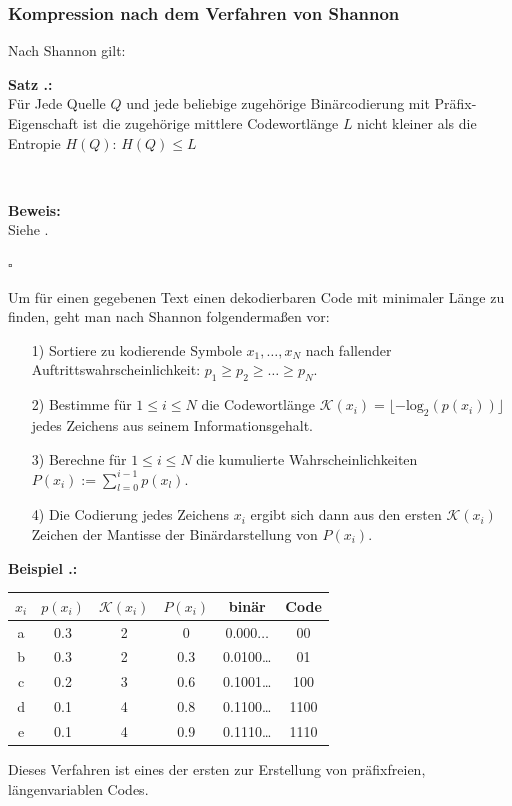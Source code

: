 \documentclass[a4paper,12pt]{article}
\newcounter{Beispiel}
\newcounter{Satz}
\newenvironment{Satz}{
\medskip
        
        \setlength{\parindent}{0pt}
        \addtocounter{Satz}{1}
        \textbf{\textsf{Satz \thesubsection.\theSatz}:}\\}{
        \nopagebreak
        \vspace{-1.0ex}
        \bigskip\\
        
}
\newenvironment{Beispiel}{
\medskip
        
        \setlength{\parindent}{0pt}
        \addtocounter{Beispiel}{1}
        \textbf{\textsf{Beispiel \thesubsection.\theBeispiel}:}\\}{
        \nopagebreak
        \vspace{-1.0ex}
        \bigskip
        
}
\newenvironment{proof}{
\bigskip
        
        \setlength{\parindent}{0pt}
        \textbf{Beweis:}\\}{
        \nopagebreak
        \vspace{-1.0ex}
        \begin{flushright}
             $\square$
        \end{flushright}
        \bigskip
        
}
\begin{document}
\subsubsection{Kompression nach dem Verfahren von Shannon}
Nach Shannon gilt:
\begin{Satz}
Für Jede Quelle $Q$ und jede beliebige zugehörige Binärcodierung mit 
Präfix-Eigenschaft ist die zugehörige mittlere Codewortlänge $L$ 
nicht kleiner als die Entropie $H(Q)$: $H(Q)\leq L$
\end{Satz}
\begin{proof}
Siehe \cite{Rohling}.
\end{proof}
Um für einen gegebenen Text einen dekodierbaren Code mit minimaler Länge zu finden, geht man nach Shannon folgendermaßen vor:
\begin{itemize}
	\item[1)]  Sortiere zu kodierende Symbole $x_{1},\ldots,x_{N}$ nach fallender Auftrittswahrscheinlichkeit: 
$p_{1}\geq p_{2}\geq\ldots\geq p_{N}$.
	\item[2)] Bestimme für $1\leq i \leq N$ die Codewortlänge $\mathcal{K}(x_{i}) = \lfloor -\text{log}_2(p(x_{i}))\rfloor$ jedes Zeichens aus seinem Informationsgehalt.
	\item[3)] Berechne für $1\leq i \leq N$ die kumulierte Wahrscheinlichkeiten $P(x_{i}):=\sum_{l=0}^{i-1}p(x_{l})$.
	\item[4)] Die Codierung jedes Zeichens $x_{i}$ ergibt sich dann aus den ersten $\mathcal{K}(x_{i})$ Zeichen der Mantisse der Binärdarstellung von $P(x_{i})$.
\end{itemize}
\begin{Beispiel}

\begin{center}
\begin{tabular}{c|c|c|c|c|c}
$x_{i}$ & $p(x_{i})$ & $\mathcal{K}(x_{i})$ & $P(x_{i})$ & binär & Code
\\
\hline
a & 0.3 & 2 & 0 & $0.000\ldots$ & 00
\\
\hline
b & 0.3  & 2 & 0.3 & 0.0100\ldots & 01
\\
\hline
c & 0.2  & 3 & 0.6 & 0.1001\ldots & 100
\\
\hline
d & 0.1  & 4 & 0.8 & 0.1100\ldots & 1100
\\
\hline
e & 0.1  & 4 & 0.9 & 0.1110\ldots & 1110
\end{tabular}
\end{center}
\end{Beispiel}
Dieses Verfahren ist eines der ersten zur Erstellung von präfixfreien, längenvariablen Codes.
\end{document}
